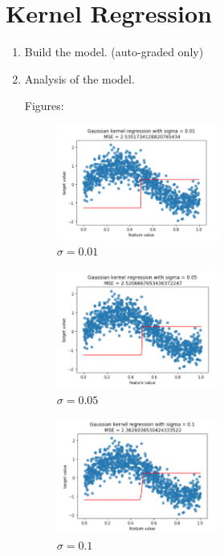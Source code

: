 \section{Kernel Regression}

\begin{enumerate}
    \item Build the model. (auto-graded only)
    
    \item Analysis of the model.

Figures:
\begin{figure}[H]
  \caption{$\sigma = 0.01$}
  \centering
    \includegraphics[width=0.5\textwidth]{images/1.png}
\end{figure}

\begin{figure}[H]
  \caption{$\sigma = 0.05$}
  \centering
    \includegraphics[width=0.5\textwidth]{images/2.png}
\end{figure}

\begin{figure}[H]
  \caption{$\sigma = 0.1$}
  \centering
    \includegraphics[width=0.5\textwidth]{images/3.png}
\end{figure}
    

\end{enumerate}
